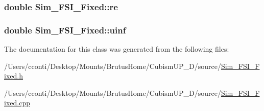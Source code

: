 \subsubsection[{re}]{\setlength{\rightskip}{0pt plus 5cm}double Sim\+\_\+\+F\+S\+I\+\_\+\+Fixed\+::re\hspace{0.3cm}{\ttfamily [protected]}}\label{class_sim___f_s_i___fixed_a439d225a6a3f4dcba00ace7e66adb049}
\hypertarget{class_sim___f_s_i___fixed_adbebdb69690216b89cf81339ac4a5e0e}{}
\subsubsection[{uinf}]{\setlength{\rightskip}{0pt plus 5cm}double Sim\+\_\+\+F\+S\+I\+\_\+\+Fixed\+::uinf\hspace{0.3cm}{\ttfamily [protected]}}\label{class_sim___f_s_i___fixed_adbebdb69690216b89cf81339ac4a5e0e}


The documentation for this class was generated from the following files\+:\begin{DoxyCompactItemize}
\item 
/\+Users/cconti/\+Desktop/\+Mounts/\+Brutus\+Home/\+Cubism\+U\+P\+\_\+D/source/\hyperlink{_sim___f_s_i___fixed_8h}{Sim\+\_\+\+F\+S\+I\+\_\+\+Fixed.\+h}\item 
/\+Users/cconti/\+Desktop/\+Mounts/\+Brutus\+Home/\+Cubism\+U\+P\+\_\+D/source/\hyperlink{_sim___f_s_i___fixed_8cpp}{Sim\+\_\+\+F\+S\+I\+\_\+\+Fixed.\+cpp}\end{DoxyCompactItemize}

